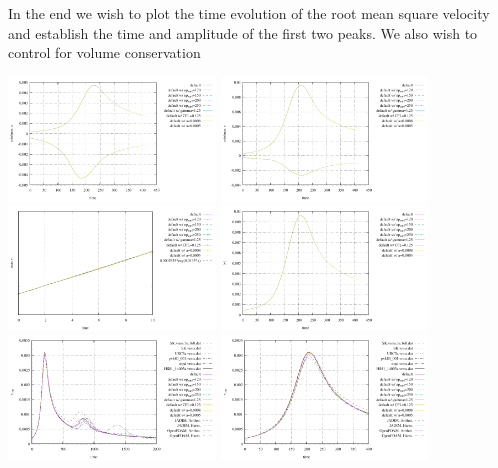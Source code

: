 In the end we wish to plot the time evolution of the root mean square velocity and 
establish the time and amplitude of the first two peaks. We also wish to control 
for volume conservation 


\begin{center}
\includegraphics[width=5.5cm]{python_codes/fieldstone_95/results/u}
\includegraphics[width=5.5cm]{python_codes/fieldstone_95/results/v}\\
\includegraphics[width=5.5cm]{python_codes/fieldstone_95/results/v_start}
\includegraphics[width=5.5cm]{python_codes/fieldstone_95/results/vel}\\
\includegraphics[width=5.5cm]{python_codes/fieldstone_95/results/vrms2000}
\includegraphics[width=5.5cm]{python_codes/fieldstone_95/results/vrms400}

\end{center}
